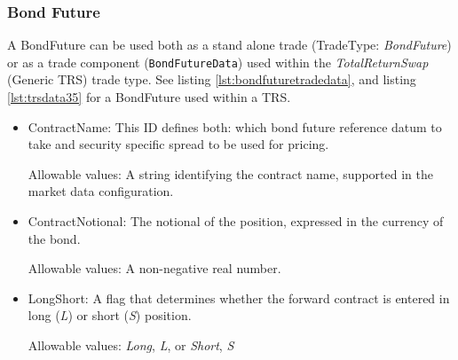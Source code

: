 \subsubsection{Bond Future}
\label{ss:bondfuture}

\ifdefined{}\fi

A BondFuture can be used both as a stand alone trade (TradeType:
\emph{BondFuture}) or as a trade component ({\tt BondFutureData}) used within the
\emph{TotalReturnSwap} (Generic TRS) trade type. See listing \ref{lst:bondfuturetradedata}, and listing \ref{lst:trsdata35} for a BondFuture used within a TRS.

\begin{itemize}
  \item ContractName: This ID defines both: which bond future reference datum to take and security specific spread to be used for pricing.

  Allowable values: A string identifying the contract name, supported in the market data configuration.
  \item ContractNotional: The notional of the position, expressed in the currency of the bond.

  Allowable values: A non-negative real number.
  \item LongShort: A flag that determines whether the forward contract is entered in long (\emph{L}) or short (\emph{S}) position.

  Allowable values: \emph{Long}, \emph{L}, or \emph{Short}, \emph{S}
\end{itemize}

